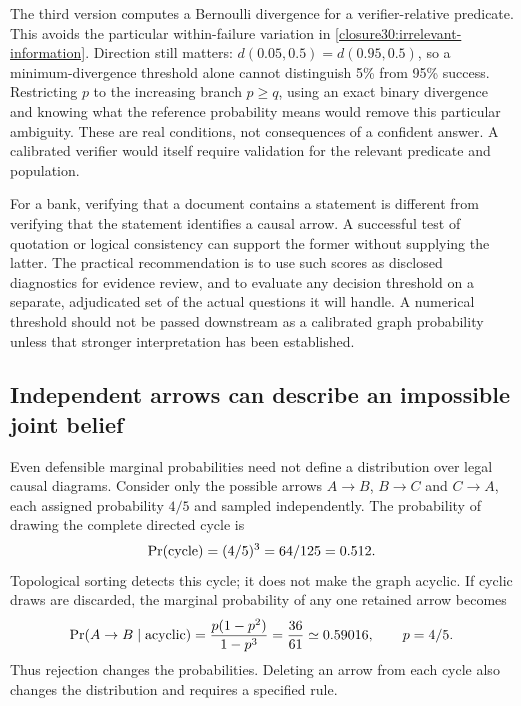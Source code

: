 The third version computes a Bernoulli divergence for a verifier-relative
predicate. This avoids the particular within-failure variation in
\eqref{closure30:irrelevant-information}. Direction still matters:
$d(0.05,0.5)=d(0.95,0.5)$, so a minimum-divergence threshold alone cannot
distinguish 5\% from 95\% success. Restricting $p$ to the increasing branch
$p\geq q$, using an exact binary divergence and knowing what the reference
probability means would remove this particular ambiguity. These are real
conditions, not consequences of a confident answer. A calibrated verifier
would itself require validation for the relevant predicate and population.
\citep[Sections 3.5--3.6, Algorithm 1 and Appendix A.5]
{closure30chlonthree}

For a bank, verifying that a document contains a statement is different from
verifying that the statement identifies a causal arrow. A successful test of
quotation or logical consistency can support the former without supplying
the latter. The practical recommendation is to use such scores as disclosed
diagnostics for evidence review, and to evaluate any decision threshold on a
separate, adjudicated set of the actual questions it will handle. A numerical
threshold should not be passed downstream as a calibrated graph probability
unless that stronger interpretation has been established.

\subsection{Independent arrows can describe an impossible joint belief}

Even defensible marginal probabilities need not define a distribution over
legal causal diagrams. Consider only the possible arrows
$A\to B$, $B\to C$ and $C\to A$, each assigned probability $4/5$ and sampled
independently. The probability of drawing the complete directed cycle is
\begin{equation}
 \Pr(\hbox{cycle})=(4/5)^3=64/125=0.512.
 \label{closure30:cycle-probability}
\end{equation}
Topological sorting detects this cycle; it does not make the graph acyclic.
If cyclic draws are discarded, the marginal probability of any one retained
arrow becomes
\begin{equation}
 \Pr(A\to B\mid\hbox{acyclic})
 =\frac{p(1-p^2)}{1-p^3}
 =\frac{36}{61}\simeq0.59016,\qquad p=4/5.
 \label{closure30:cycle-conditioning}
\end{equation}
Thus rejection changes the probabilities. Deleting an arrow from each cycle
also changes the distribution and requires a specified rule.

